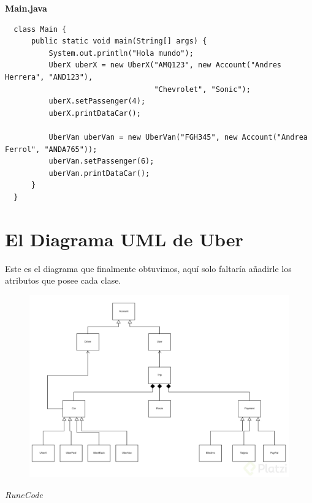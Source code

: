 \documentclass{article}
\begin{document}
\textbf{Main.java}
\begin{verbatim}
  class Main {
      public static void main(String[] args) {
          System.out.println("Hola mundo");
          UberX uberX = new UberX("AMQ123", new Account("Andres Herrera", "AND123"),
                                  "Chevrolet", "Sonic");
          uberX.setPassenger(4);
          uberX.printDataCar();

          UberVan uberVan = new UberVan("FGH345", new Account("Andrea Ferrol", "ANDA765"));
          uberVan.setPassenger(6);
          uberVan.printDataCar();
      }
  }
\end{verbatim}

\section{El Diagrama UML de Uber}%
Este es el diagrama que finalmente obtuvimos, aquí solo faltaría añadirle los
atributos que posee cada clase.

\begin{figure}[h!]
  \centering
  \includegraphics[scale=0.25]{./Pictures/033_uml_Uber.jpg}
\end{figure}




\vspace{2cm}
\LARGE\textit{RuneCode}
\end{document}
